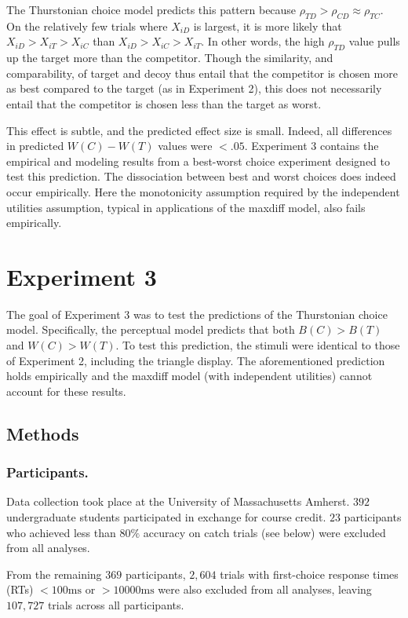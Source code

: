 The Thurstonian choice model predicts this pattern because $\rho_{TD}>\rho_{CD}\approx\rho_{TC}$. On the relatively few trials where $X_{iD}$ is largest, it is more likely that $X_{iD}>X_{iT}>X_{iC}$ than $X_{iD}>X_{iC}>X_{iT}$. In other words, the high $\rho_{TD}$ value pulls up the target more than the competitor. Though the similarity, and comparability, of target and decoy thus entail that the competitor is chosen more as best compared to the target (as in Experiment 2), this does not necessarily entail that the competitor is chosen less than the target as worst.

This effect is subtle, and the predicted effect size is small. Indeed, all differences in predicted $W(C)-W(T)$ values were $<.05$. Experiment 3 contains the empirical and modeling results from a best-worst choice experiment designed to test this prediction. The dissociation between best and worst choices does indeed occur empirically. Here the monotonicity assumption required by the independent utilities assumption, typical in applications of the maxdiff model, also fails empirically.

\section{Experiment 3}

The goal of Experiment 3 was to test the predictions of the Thurstonian choice model. Specifically, the perceptual model predicts that both $B(C)>B(T)$ and $W(C)>W(T)$. To test this prediction, the stimuli were identical to those of Experiment 2, including the triangle display. The aforementioned prediction holds empirically and the maxdiff model (with independent utilities) cannot account for these results.

\subsection{Methods}

\subsubsection{Participants.}
Data collection took place at the University of Massachusetts Amherst. $392$ undergraduate students participated in exchange for course credit. $23$ participants who achieved less than $80\%$ accuracy on catch trials (see below) were excluded from all analyses. 

From the remaining $369$ participants, $2,604$ trials with first-choice response times (RTs) $<100\text{ms}$ or $>10000\text{ms}$ were also excluded from all analyses, leaving $107,727$ trials across all participants.

